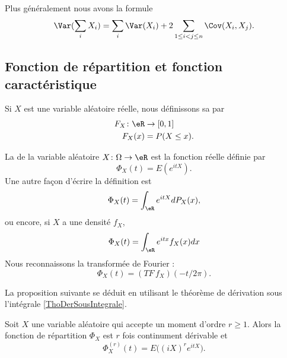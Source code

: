 Plus généralement nous avons la formule
\begin{equation}
    \Var(\sum_i X_i)=\sum_i\Var(X_i)+2\sum_{1\leq i< j\leq n}\Cov(X_i,X_j).
\end{equation}


\subsection{Fonction de répartition et fonction caractéristique}

Si \( X\) est une variable aléatoire réelle, nous définissons sa  par
\begin{equation}
    \begin{aligned}
        F_X\colon \eR&\to \mathopen[ 0 , 1 \mathclose] \\
        F_X(x)&=P(X\leq x). 
    \end{aligned}
\end{equation}


La  de la variable aléatoire \( X\colon \Omega\to \eR\) est la fonction réelle définie par
\begin{equation}
    \Phi_X(t)=E( e^{itX}).
\end{equation}
Une autre façon d'écrire la définition est
\begin{equation}
    \Phi_X(t)=\int_{\eR} e^{itX}dP_X(x),
\end{equation}
ou encore, si \( X\) a une densité \( f_X\),
\begin{equation}        \label{EqFnCaractfncadens}
    \Phi_X(t)=\int_{\eR} e^{itx}f_X(x)dx
\end{equation}
Nous reconnaissons la transformée de Fourier :
\begin{equation}
    \Phi_X(t)=(TF\,f_X)(-t/2\pi).
\end{equation}

La proposition suivante se déduit en utilisant le théorème de dérivation sous l'intégrale \ref{ThoDerSousIntegrale}.
\begin{proposition}     \label{PropDerFnCaract}
    Soit $X$ une variable aléatoire qui accepte un moment d'ordre \( r\geq 1\). Alors la fonction de répartition \( \Phi_X\) est \( r\) fois continument dérivable et
    \begin{equation}
        \Phi_X^{(r)}(t)=E\big( (iX)^r e^{itX} \big).
    \end{equation}
\end{proposition}

